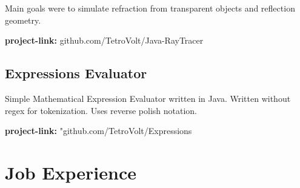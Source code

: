 \documentclass{article}
\begin{document}
\noindent{$\ \bullet$} Main goals were to simulate refraction from transparent objects and reflection geometry.

\noindent{$\ \bullet$} \textbf{project-link:} github.com/TetroVolt/Java-RayTracer

\subsection{Expressions Evaluator}
\noindent Simple Mathematical Expression Evaluator written in Java. Written without
regex for tokenization. Uses reverse polish notation.

\noindent{$\ \bullet$}\textbf{project-link:} "github.com/TetroVolt/Expressions

\section{Job Experience}
\end{document}
